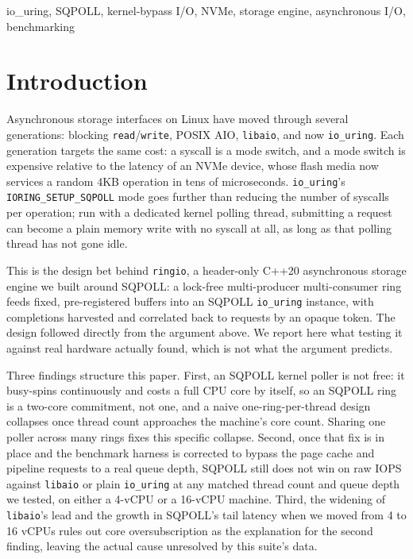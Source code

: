 \documentclass[conference]{IEEEtran}
\begin{document}
\begin{IEEEkeywords}
io\_uring, SQPOLL, kernel-bypass I/O, NVMe, storage engine, asynchronous I/O, benchmarking
\end{IEEEkeywords}

\section{Introduction}

Asynchronous storage interfaces on Linux have moved through several generations: blocking
\texttt{read}/\texttt{write}, POSIX AIO, \texttt{libaio}, and now \texttt{io\_uring}. Each
generation targets the same cost: a syscall is a mode switch, and a mode switch is expensive
relative to the latency of an NVMe device, whose flash media now services a random 4KB
operation in tens of microseconds. \texttt{io\_uring}'s \texttt{IORING\_SETUP\_SQPOLL} mode goes
further than reducing the number of syscalls per operation; run with a dedicated kernel polling
thread, submitting a request can become a plain memory write with no syscall at all, as long as
that polling thread has not gone idle.

This is the design bet behind \texttt{ringio}, a header-only C++20 asynchronous storage engine
we built around SQPOLL: a lock-free multi-producer multi-consumer ring feeds fixed, pre-registered
buffers into an SQPOLL \texttt{io\_uring} instance, with completions harvested and correlated back
to requests by an opaque token. The design followed directly from the argument above. We report
here what testing it against real hardware actually found, which is not what the argument
predicts.

Three findings structure this paper. First, an SQPOLL kernel poller is not free: it busy-spins
continuously and costs a full CPU core by itself, so an SQPOLL ring is a two-core commitment, not
one, and a naive one-ring-per-thread design collapses once thread count approaches the machine's
core count. Sharing one poller across many rings fixes this specific collapse. Second, once that
fix is in place and the benchmark harness is corrected to bypass the page cache and pipeline
requests to a real queue depth, SQPOLL still does not win on raw IOPS against \texttt{libaio} or
plain \texttt{io\_uring} at any matched thread count and queue depth we tested, on either a
4-vCPU or a 16-vCPU machine. Third, the widening of \texttt{libaio}'s lead and the growth in
SQPOLL's tail latency when we moved from 4 to 16 vCPUs rules out core oversubscription as the
explanation for the second finding, leaving the actual cause unresolved by this suite's data.
\end{document}

